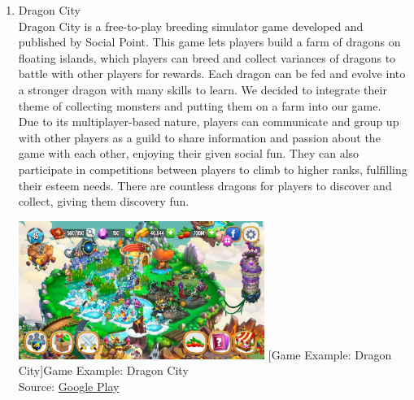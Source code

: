 \documentclass[12pt,oneside,openright,a4paper]{cpe-english-project}
\begin{document}
\begin{enumerate}
	\item Dragon City \\
	Dragon City is a free-to-play breeding simulator game developed and published by Social Point. This game lets players build a farm of dragons on floating islands, which players can breed and collect variances of dragons to battle with other players for rewards. Each dragon can be fed and evolve into a stronger dragon with many skills to learn. We decided to integrate their theme of collecting monsters and putting them on a farm into our game. \\
	Due to its multiplayer-based nature, players can communicate and group up with other players as a guild to share information and passion about the game with each other, enjoying their given social fun. They can also participate in competitions between players to climb to higher ranks, fulfilling their esteem needs. There are countless dragons for players to discover and collect, giving them discovery fun. \\
	\begin{minipage}[c]{\textwidth}\centering
	\includegraphics[width=8cm]{figure/related-work-dragon-city.png}
	[Game Example: Dragon City]{Game Example: Dragon City 
		\\ Source: \href{https://play.google.com/store/apps/details?id=es.socialpoint.DragonCity&hl=en_US&gl=US}{Google Play}}
	\label{fig:related-work-dragon-city}
	\end{minipage}


\end{enumerate}
\end{document}
